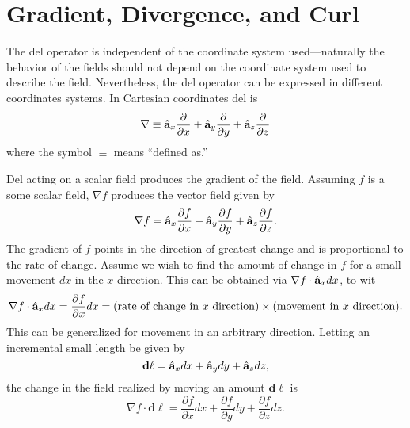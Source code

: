 \section{Gradient, Divergence, and Curl}

The del operator is independent of the coordinate system
used---naturally the behavior of the fields should not depend on the
coordinate system used to describe the field.  Nevertheless, the del
operator can be expressed in different coordinates systems.  In
Cartesian coordinates del is
\begin{equation}
  \nabla \equiv \hat{\mathbf{a}}_{x} \frac{\partial}{\partial x} +
                \hat{\mathbf{a}}_{y} \frac{\partial}{\partial y} +
                \hat{\mathbf{a}}_{z} \frac{\partial}{\partial z}
\end{equation}
where the symbol $\equiv$ means ``defined as.''

Del acting on a scalar field produces the gradient of the field.
Assuming $f$ is a some scalar field, $\nabla f$ produces the vector
field given by 
\begin{equation}
  \nabla f = \hat{\mathbf{a}}_{x} \frac{\partial f}{\partial x} +
             \hat{\mathbf{a}}_{y} \frac{\partial f}{\partial y} +
             \hat{\mathbf{a}}_{z} \frac{\partial f}{\partial z}.
\end{equation}
The gradient of $f$ points in the direction of greatest change and is
proportional to the rate of change.  Assume we wish to find the amount
of change in $f$ for a small movement $dx$ in the $x$ direction.  This
can be obtained via $\nabla f \cdot \hat{\mathbf{a}}_{x} dx$, to wit
\begin{equation}
  \nabla f \cdot \hat{\mathbf{a}}_{x} dx = \frac{\partial f}{\partial x} dx
    = \mbox{(rate of change in $x$ direction)}\times
      \mbox{(movement in $x$ direction)}.
\end{equation}
This can be generalized for movement in an arbitrary direction.
Letting an incremental small length be given by
\begin{equation}
  \mathbf{d\ell} = \hat{\mathbf{a}}_{x} dx + \hat{\mathbf{a}}_{y} dy + \hat{\mathbf{a}}_{z} dz,
\end{equation}
the change in the field realized by moving an amount $\mathbf{d\ell}$
is
\begin{equation}
  \nabla f\cdot\mathbf{d\ell} = 
     \frac{\partial f}{\partial x} dx +
     \frac{\partial f}{\partial y} dy +
     \frac{\partial f}{\partial z} dz.
\end{equation}

